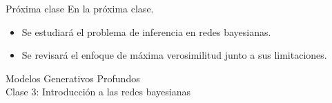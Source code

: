 \documentclass{beamer}
\begin{document}
\begin{frame}{Próxima clase}
    En la próxima clase.
    \begin{itemize}
        \item<2> Se estudiará el problema de inferencia en redes bayesianas.
        \item<3> Se revisará el enfoque de máxima verosimilitud junto a sus limitaciones.
    \end{itemize}
\end{frame}

\begin{frame}
    \centering
    \Large{Modelos Generativos Profundos}\\
    \large{Clase 3: Introducción a las redes bayesianas}
\end{frame}
\end{document}
